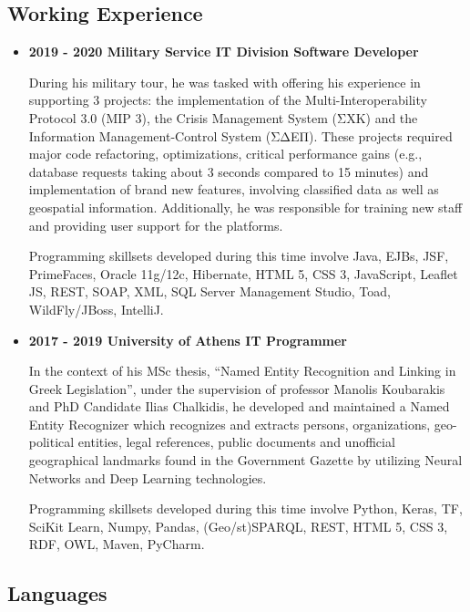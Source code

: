 \documentclass[a4paper,oneside,10pt]{article}
\begin{document}
\subsection*{Working Experience}

	\begin{itemize}

		\item \textbf{2019 - 2020 Military Service IT Division Software Developer}

			During his military tour, he was tasked with offering his experience in supporting 3 projects: the implementation of the Multi-Interoperability Protocol 3.0 (MIP 3), the Crisis Management System (ΣΧΚ) and the Information Management-Control System (ΣΔΕΠ). These projects required major code refactoring, optimizations, critical performance gains (e.g., database requests taking about 3 seconds compared to 15 minutes) and implementation of brand new features, involving classified data as well as geospatial information. Additionally, he was responsible for training new staff and providing user support for the platforms.

			Programming skillsets developed during this time involve Java, EJBs, JSF, PrimeFaces, Oracle 11g/12c, Hibernate, HTML 5, CSS 3, JavaScript, Leaflet JS, REST, SOAP, XML, SQL Server Management Studio, Toad, WildFly/JBoss, IntelliJ.

		\item \textbf{2017 - 2019 University of Athens IT Programmer}

			In the context of his MSc thesis, ``Named Entity Recognition and Linking in Greek Legislation'', under the supervision of professor Manolis Koubarakis and PhD Candidate Ilias Chalkidis, he developed and maintained a Named Entity Recognizer which recognizes and extracts persons, organizations, geo-political entities, legal references, public documents and unofficial geographical landmarks found in the Government Gazette by utilizing Neural Networks and Deep Learning technologies.

			Programming skillsets developed during this time involve Python, Keras, TF, SciKit Learn, Numpy, Pandas, (Geo/st)SPARQL, REST, HTML 5, CSS 3, RDF, OWL, Maven, PyCharm.

	\end{itemize}

\subsection*{Languages}
\end{document}

